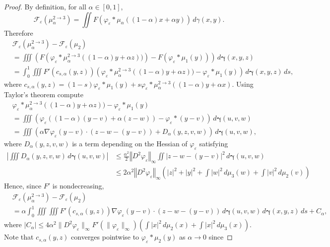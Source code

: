 \documentclass[11pt,leqno]{amsart}
\theoremstyle{definition}
\newcommand{\bes}{\begin{equation*}}
\newcommand{\ees}{\end{equation*}}
\newcommand{\norm}[1]{\left\Vert#1\right\Vert}
\newcommand{\grad}{\nabla}
\newcommand{\F}{\mathcal{F}}
\def\e{\varepsilon}
\newcommand{\bgamma}{\boldsymbol{\gamma}}
\def\F{\mathcal{F}}
\begin{document}
\begin{proof}
	By definition, for all $\alpha \in[0,1]$,
\bes
	\F_\e(\mu_\alpha^{2\to3}) = \iint F\left(\varphi_\e * \mu_\alpha((1-\alpha)x + \alpha y)\right) \,d\gamma(x,y).
\ees
Therefore
\begin{equation}   \label{diff eqn0}
	\begin{split}
	&\F_\e(\mu_\alpha^{2\to3}) - \F_\e(\mu_2)\\
	&= \iiint\left(  F\left(\varphi_\e * \mu_\alpha^{2\to3}((1-\alpha)y + \alpha z))\right) - F\left(\varphi_\e * \mu_1(y)\right)  \right) \,d \bgamma(x,y,z)\\
	&= \int_0^1 \iiint F'(c_{s,\alpha}(y,z)) \left( \varphi_\e * \mu_\alpha^{2\to3}((1-\alpha)y + \alpha z)) - \varphi_\e * \mu_1(y) \right) \,d\bgamma(x,y,z) \,ds,
	\end{split}
\end{equation}
where $c_{s,\alpha}(y,z) = (1-s)\varphi_\e*\mu_1(y) + s\varphi_\e*\mu_\alpha^{2\to3}((1-\alpha)y + \alpha x)$. Using Taylor's theorem compute
\begin{align*}
	&\varphi_\e * \mu_\alpha^{2\to3}((1-\alpha)y + \alpha z)) - \varphi_\e * \mu_1(y)\\
	&= \iiint \left( \varphi_\e((1-\alpha) (y-v) + \alpha (z-w)) - \varphi_\e*(y-v) \right) \,d\bgamma(u,v,w)\\
	&= \iiint \left( \alpha \grad \varphi_\e(y-v) \cdot (z-w - (y-v)) + D_\alpha(y,z,v,w)\right) \,d\bgamma(u,v,w),
\end{align*}
where $D_\alpha(y,z,v,w)$ is a term depending on the Hessian of $\varphi_\e$ satisfying
\begin{align*}
	\left|\iiint  D_\alpha(y,z,v,w) \,d\bgamma(u,v,w)\right| &\leq \frac{\alpha^2}{2} \norm{D^2\varphi_\e}_\infty \iint |z-w-(y-v)|^2 \,d\bgamma(u,v,w)\\
	&\leq 2\alpha^2 \norm{D^2\varphi_\e}_\infty \left( |z|^2 + |y|^2 + \int |w|^2\,d\mu_3(w)+\int|v|^2 \,d\mu_2(v) \right)
\end{align*}
Hence, since $F'$ is nondecreasing,
\begin{align*}
	&\F_\e(\mu_\alpha^{2\to3}) - \F_\e(\mu_2)\\
	 &= \alpha \int_0^1 \iiint \iiint F'(c_{s,\alpha}(y,z)) \grad \varphi_\e(y-v) \cdot (z-w-(y-v)) \,d\bgamma(u,v,w) \,d\bgamma(x,y,z)\,ds + C_\alpha, 
\end{align*}
where $|C_\alpha| \leq 4\alpha^2 \|D^2\varphi_\e\|_\infty F'( \|\varphi_\e\|_\infty) (\int |x|^2 \,d\mu_2(x) + \int |x|^2 \,d\mu_3(x))$. Note that $c_{s,\alpha}(y,z)$ converges pointwise to $\varphi_\e*\mu_2(y)$ as $\alpha\to0$ since

\end{proof}
\end{document}
